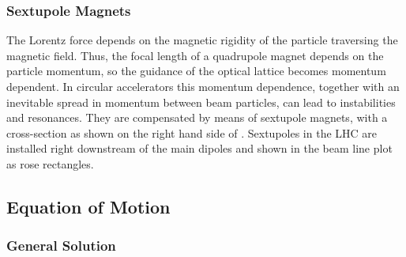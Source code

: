 \subsubsection{Sextupole Magnets}

The Lorentz force depends on the magnetic rigidity of the particle traversing the magnetic field. Thus, the focal length of a quadrupole magnet depends on the particle momentum, so the guidance of the optical lattice becomes momentum dependent. In circular accelerators this momentum dependence, together with an inevitable spread in momentum between beam particles, can lead to instabilities and resonances. They are compensated by means of sextupole magnets, with a cross-section as shown on the right hand side of . Sextupoles in the LHC are installed right downstream of the main dipoles and shown in the beam line plot as rose rectangles.


\subsection{Equation of Motion}\label{chap:eqmotion}
\subsubsection{General Solution}

